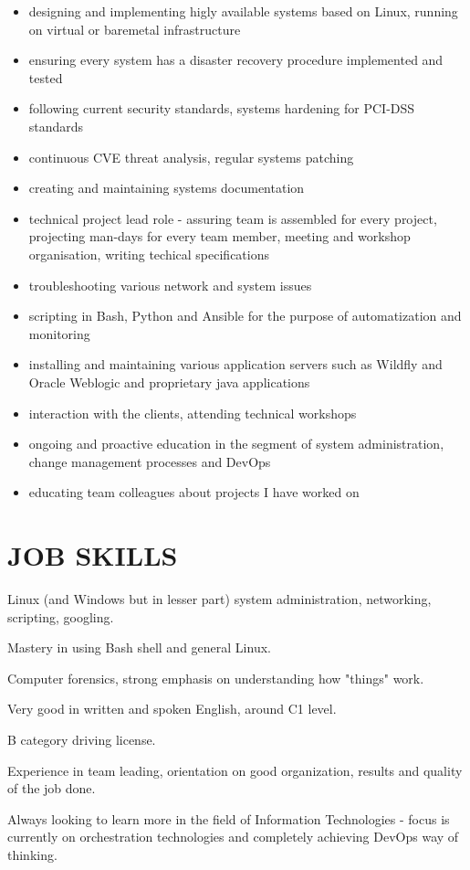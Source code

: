 \documentclass{cv}
\begin{document}
\begin{itemize}
    \setlength\itemsep{0.1cm}
    \item designing and implementing higly available systems based on Linux, running on virtual or baremetal infrastructure
    \item ensuring every system has a disaster recovery procedure implemented and tested
    \item following current security standards, systems hardening for PCI-DSS standards 
    \item continuous CVE threat analysis, regular systems patching 
    \item creating and maintaining systems documentation
    \item technical project lead role - assuring team is assembled for every project, projecting man-days for every team member, meeting and workshop organisation, writing techical specifications
    \item troubleshooting various network and system issues 
    \item scripting in Bash, Python and Ansible for the purpose of automatization and monitoring
    \item installing and maintaining various application servers such as Wildfly and Oracle Weblogic and proprietary java applications
    \item interaction with the clients, attending technical workshops
    \item ongoing and proactive education in the segment of system administration, change management processes and DevOps
    \item educating team colleagues about projects I have worked on
\end{itemize}
\section{JOB SKILLS}
Linux (and Windows but in lesser part) system administration, networking, scripting, googling.

Mastery in using Bash shell and general Linux.

Computer forensics, strong emphasis on understanding how "things" work.

Very good in written and spoken English, around C1 level.

B category driving license.

Experience in team leading, orientation on good organization, results and quality of the job done.

Always looking to learn more in the field of Information Technologies - focus is currently on orchestration technologies and completely achieving DevOps way of thinking.
\end{document}
